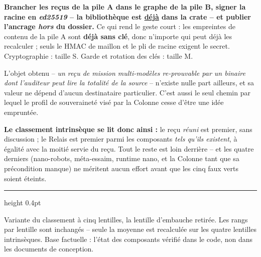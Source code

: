 \documentclass[10pt]{article}
\newcommand{\sz}[1]{{\small\color{grey}\textsf{#1}}}
\begin{document}
\begin{cle}
\textbf{Brancher les reçus de la pile A dans le graphe de la pile B, signer la racine en \emph{ed25519}
-- la bibliothèque est \underline{déjà} dans la crate -- et publier l'ancrage \emph{hors} du dossier.}
Ce qui rend le geste court : les empreintes de contenu de la pile A sont \textbf{déjà sans clé}, donc
n'importe qui peut déjà les recalculer ; seuls le HMAC de maillon et le pli de racine exigent le secret.
\sz{Cryptographie : taille S. Garde et rotation des clés : taille M.}
\end{cle}

L'objet obtenu -- \emph{un reçu de mission multi-modèles re-prouvable par un binaire dont l'auditeur peut
lire la totalité de la source} -- n'existe nulle part ailleurs, et sa valeur ne dépend d'aucun
destinataire particulier. C'est aussi le seul chemin par lequel le profil de souveraineté visé par la
Colonne cesse d'être une idée empruntée.

\textbf{Le classement intrinsèque se lit donc ainsi :} le reçu \emph{réuni} est premier, sans discussion ;
le Relais est premier parmi les composants \emph{tels qu'ils existent}, à égalité avec la moitié servie du
reçu. Tout le reste est loin derrière -- et les quatre derniers (nano-robots, méta-essaim, runtime nano,
et la Colonne tant que sa précondition manque) ne méritent aucun effort avant que les cinq faux verts
soient éteints.

\vspace{3pt}
{\color{grey}\hrule height 0.4pt}
\vspace{2pt}
{\footnotesize\color{grey}Variante du classement à cinq lentilles, la lentille d'embauche retirée. Les
rangs par lentille sont inchangés -- seule la moyenne est recalculée sur les quatre lentilles
intrinsèques. Base factuelle : l'état des composants vérifié dans le code, non dans les documents de
conception.}
\end{document}
